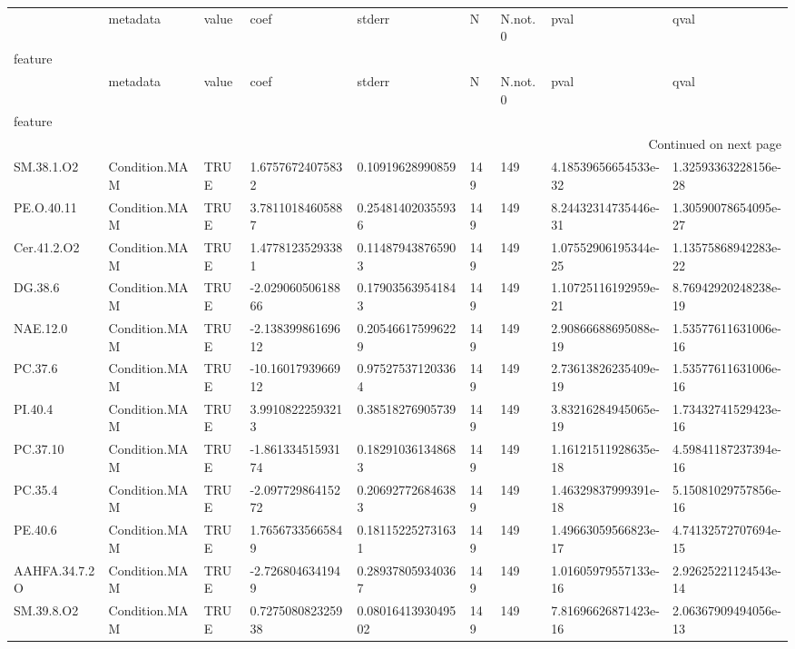 \begin{longtable}{lllllllll}
\toprule
 & metadata & value & coef & stderr & N & N.not.0 & pval & qval \\
feature &  &  &  &  &  &  &  &  \\
\midrule
\endfirsthead
\toprule
 & metadata & value & coef & stderr & N & N.not.0 & pval & qval \\
feature &  &  &  &  &  &  &  &  \\
\midrule
\endhead
\midrule
\multicolumn{9}{r}{Continued on next page} \\
\midrule
\endfoot
\bottomrule
\endlastfoot
SM.38.1.O2 & Condition.MAM & TRUE & 1.67576724075832 & 0.10919628990859 & 149 & 149 & 4.18539656654533e-32 & 1.32593363228156e-28 \\
PE.O.40.11 & Condition.MAM & TRUE & 3.78110184605887 & 0.254814020355936 & 149 & 149 & 8.24432314735446e-31 & 1.30590078654095e-27 \\
Cer.41.2.O2 & Condition.MAM & TRUE & 1.47781235293381 & 0.114879438765903 & 149 & 149 & 1.07552906195344e-25 & 1.13575868942283e-22 \\
DG.38.6 & Condition.MAM & TRUE & -2.02906050618866 & 0.179035639541843 & 149 & 149 & 1.10725116192959e-21 & 8.76942920248238e-19 \\
NAE.12.0 & Condition.MAM & TRUE & -2.13839986169612 & 0.205466175996229 & 149 & 149 & 2.90866688695088e-19 & 1.53577611631006e-16 \\
PC.37.6 & Condition.MAM & TRUE & -10.1601793966912 & 0.975275371203364 & 149 & 149 & 2.73613826235409e-19 & 1.53577611631006e-16 \\
PI.40.4 & Condition.MAM & TRUE & 3.99108222593213 & 0.38518276905739 & 149 & 149 & 3.83216284945065e-19 & 1.73432741529423e-16 \\
PC.37.10 & Condition.MAM & TRUE & -1.86133451593174 & 0.182910361348683 & 149 & 149 & 1.16121511928635e-18 & 4.59841187237394e-16 \\
PC.35.4 & Condition.MAM & TRUE & -2.09772986415272 & 0.206927726846383 & 149 & 149 & 1.46329837999391e-18 & 5.15081029757856e-16 \\
PE.40.6 & Condition.MAM & TRUE & 1.76567335665849 & 0.181152252731631 & 149 & 149 & 1.49663059566823e-17 & 4.74132572707694e-15 \\
AAHFA.34.7.2O & Condition.MAM & TRUE & -2.7268046341949 & 0.289378059340367 & 149 & 149 & 1.01605979557133e-16 & 2.92625221124543e-14 \\
SM.39.8.O2 & Condition.MAM & TRUE & 0.727508082325938 & 0.0801641393049502 & 149 & 149 & 7.81696626871423e-16 & 2.06367909494056e-13 \\

\end{longtable}
